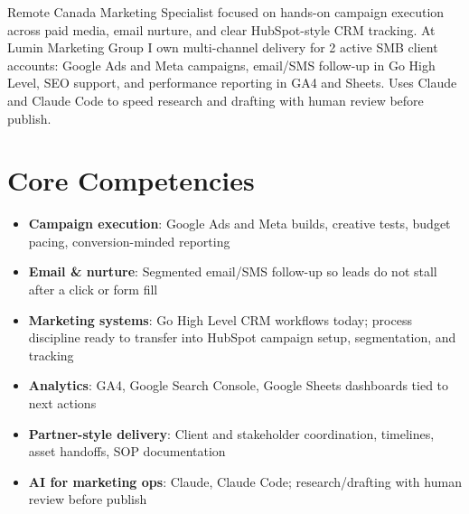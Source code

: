 \documentclass[11pt,a4paper,sans]{moderncv}
\begin{document}
\makecvtitle

\vspace{6pt}
\small{Remote Canada Marketing Specialist focused on hands-on campaign execution across paid media, email nurture, and clear HubSpot-style CRM tracking. At Lumin Marketing Group I own multi-channel delivery for 2 active SMB client accounts: Google Ads and Meta campaigns, email/SMS follow-up in Go High Level, SEO support, and performance reporting in GA4 and Sheets. Uses Claude and Claude Code to speed research and drafting with human review before publish.}

\section{Core Competencies}
\vspace{1pt}
\begin{itemize}
\item \textbf{Campaign execution}: Google Ads and Meta builds, creative tests, budget pacing, conversion-minded reporting
\item \textbf{Email \& nurture}: Segmented email/SMS follow-up so leads do not stall after a click or form fill
\item \textbf{Marketing systems}: Go High Level CRM workflows today; process discipline ready to transfer into HubSpot campaign setup, segmentation, and tracking
\item \textbf{Analytics}: GA4, Google Search Console, Google Sheets dashboards tied to next actions
\item \textbf{Partner-style delivery}: Client and stakeholder coordination, timelines, asset handoffs, SOP documentation
\item \textbf{AI for marketing ops}: Claude, Claude Code; research/drafting with human review before publish
\end{itemize}
\end{document}
